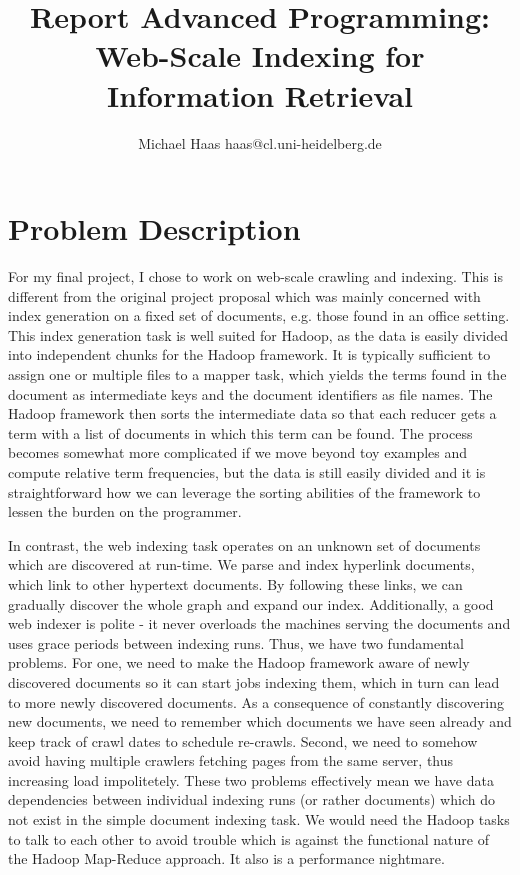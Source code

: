 \documentclass[10pt,a4paper]{report}
\author{Michael Haas haas@cl.uni-heidelberg.de}
\title{Report Advanced Programming: Web-Scale Indexing for Information Retrieval}
\begin{document}
\maketitle
\section*{Problem Description}
\label{ProblemDescription} 
For my final project, I chose to work on web-scale crawling and indexing. This is different from the original
project proposal which was mainly concerned with index generation on a fixed set of documents, e.g. those
found in an office setting. This index generation task is well suited for Hadoop, as the data is easily divided
into independent chunks for the Hadoop framework. It is typically sufficient to assign one or multiple files
to a mapper task, which yields the terms found in the document as intermediate keys and the document identifiers
as file names. The Hadoop framework then sorts the intermediate data so that each reducer gets a term with a list
of documents in which this term can be found. The process becomes somewhat more complicated if we move beyond toy examples
and compute relative term frequencies, but the data is still easily divided and it is straightforward how we can leverage
the sorting abilities of the framework to lessen the burden on the programmer.

In contrast, the web indexing task operates on an unknown set of documents which are discovered at run-time.
We parse and index hyperlink documents, which link to other hypertext documents. By following these links, we can
gradually discover the whole graph and expand our index. Additionally, a good web indexer is polite - it never overloads
the machines serving the documents and uses grace periods between indexing runs. Thus, we have two fundamental problems.
For one, we need to make the Hadoop framework aware of newly discovered documents so it can start jobs indexing them, which
in turn can lead to more newly discovered documents. As a consequence of constantly discovering new documents,
we need to remember which documents we have seen already and keep track of crawl dates to schedule re-crawls.
Second, we need to somehow avoid having multiple crawlers fetching
pages from the same server, thus increasing load impolitetely. These two problems effectively mean
we have data dependencies between
individual indexing runs (or rather documents) which do not exist in the simple document indexing task. We would need the Hadoop
tasks to talk to each other to avoid trouble which is against the functional nature of the Hadoop Map-Reduce approach. It
also is a performance nightmare.
\end{document}
